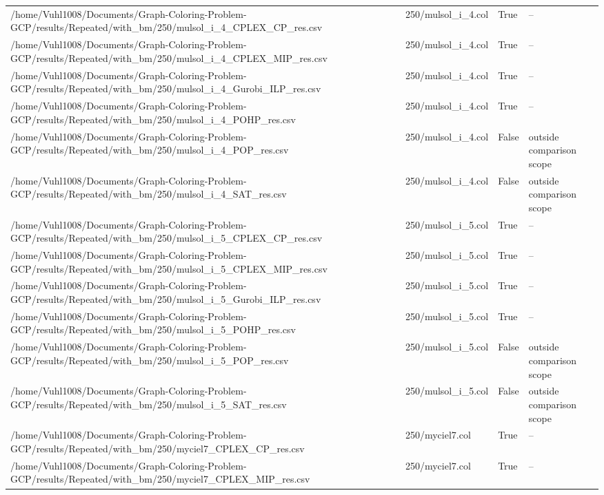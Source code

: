 \begin{table}[htbp]
\begin{tabular}{llll}
/home/Vuhl1008/Documents/Graph-Coloring-Problem-GCP/results/Repeated/with\_bm/250/mulsol\_i\_4\_CPLEX\_CP\_res.csv & 250/mulsol\_i\_4.col & True & -- \\
/home/Vuhl1008/Documents/Graph-Coloring-Problem-GCP/results/Repeated/with\_bm/250/mulsol\_i\_4\_CPLEX\_MIP\_res.csv & 250/mulsol\_i\_4.col & True & -- \\
/home/Vuhl1008/Documents/Graph-Coloring-Problem-GCP/results/Repeated/with\_bm/250/mulsol\_i\_4\_Gurobi\_ILP\_res.csv & 250/mulsol\_i\_4.col & True & -- \\
/home/Vuhl1008/Documents/Graph-Coloring-Problem-GCP/results/Repeated/with\_bm/250/mulsol\_i\_4\_POHP\_res.csv & 250/mulsol\_i\_4.col & True & -- \\
/home/Vuhl1008/Documents/Graph-Coloring-Problem-GCP/results/Repeated/with\_bm/250/mulsol\_i\_4\_POP\_res.csv & 250/mulsol\_i\_4.col & False & outside comparison scope \\
/home/Vuhl1008/Documents/Graph-Coloring-Problem-GCP/results/Repeated/with\_bm/250/mulsol\_i\_4\_SAT\_res.csv & 250/mulsol\_i\_4.col & False & outside comparison scope \\
/home/Vuhl1008/Documents/Graph-Coloring-Problem-GCP/results/Repeated/with\_bm/250/mulsol\_i\_5\_CPLEX\_CP\_res.csv & 250/mulsol\_i\_5.col & True & -- \\
/home/Vuhl1008/Documents/Graph-Coloring-Problem-GCP/results/Repeated/with\_bm/250/mulsol\_i\_5\_CPLEX\_MIP\_res.csv & 250/mulsol\_i\_5.col & True & -- \\
/home/Vuhl1008/Documents/Graph-Coloring-Problem-GCP/results/Repeated/with\_bm/250/mulsol\_i\_5\_Gurobi\_ILP\_res.csv & 250/mulsol\_i\_5.col & True & -- \\
/home/Vuhl1008/Documents/Graph-Coloring-Problem-GCP/results/Repeated/with\_bm/250/mulsol\_i\_5\_POHP\_res.csv & 250/mulsol\_i\_5.col & True & -- \\
/home/Vuhl1008/Documents/Graph-Coloring-Problem-GCP/results/Repeated/with\_bm/250/mulsol\_i\_5\_POP\_res.csv & 250/mulsol\_i\_5.col & False & outside comparison scope \\
/home/Vuhl1008/Documents/Graph-Coloring-Problem-GCP/results/Repeated/with\_bm/250/mulsol\_i\_5\_SAT\_res.csv & 250/mulsol\_i\_5.col & False & outside comparison scope \\
/home/Vuhl1008/Documents/Graph-Coloring-Problem-GCP/results/Repeated/with\_bm/250/myciel7\_CPLEX\_CP\_res.csv & 250/myciel7.col & True & -- \\
/home/Vuhl1008/Documents/Graph-Coloring-Problem-GCP/results/Repeated/with\_bm/250/myciel7\_CPLEX\_MIP\_res.csv & 250/myciel7.col & True & -- \\

\end{tabular}
\end{table}
